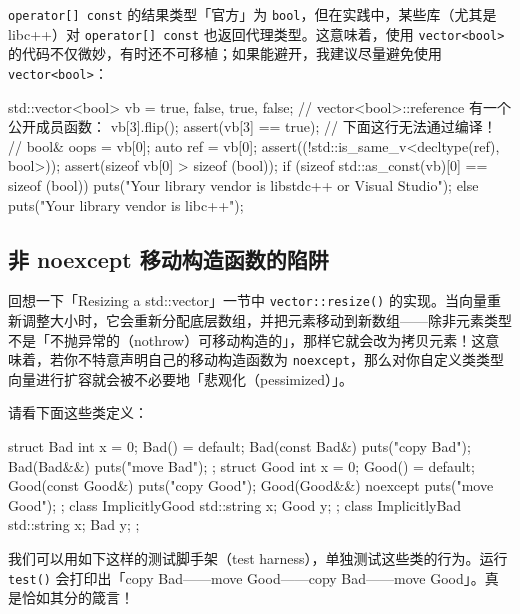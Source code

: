 \texttt{operator[] const} 的结果类型「官方」为 \texttt{bool}，但在实践中，某些库（尤其是 libc++）对 \texttt{operator[] const} 也返回代理类型。这意味着，使用 \texttt{vector<\allowbreak{}bool>\allowbreak{}} 的代码不仅微妙，有时还不可移植；如果能避开，我建议尽量避免使用 \texttt{vector<\allowbreak{}bool>\allowbreak{}}：

\begin{codebox}[cpp]
    std::vector<bool> vb = {true, false, true, false};
    // vector<bool>::reference 有一个公开成员函数：
    vb[3].flip();
    assert(vb[3] == true);
    // 下面这行无法通过编译！
    // bool& oops = vb[0];
    auto ref = vb[0];
    assert((!std::is_same_v<decltype(ref), bool>));
    assert(sizeof vb[0] > sizeof (bool));
    if (sizeof std::as_const(vb)[0] == sizeof (bool)) {
      puts("Your library vendor is libstdc++ or Visual Studio");
    } else {
      puts("Your library vendor is libc++");
    }
\end{codebox}

\subsection{非 noexcept 移动构造函数的陷阱}

回想一下「Resizing a std::vector」一节中 \texttt{vector::\allowbreak{}resize(\allowbreak{})\allowbreak{}} 的实现。当向量重新调整大小时，它会重新分配底层数组，并把元素移动到新数组——除非元素类型不是「不抛异常的（nothrow）可移动构造的」，那样它就会改为拷贝元素！这意味着，若你不特意声明自己的移动构造函数为 \texttt{noexcept}，那么对你自定义类类型向量进行扩容就会被不必要地「悲观化（pessimized）」。

请看下面这些类定义：

\begin{codebox}[cpp]
    struct Bad {
      int x = 0;
      Bad() = default;
      Bad(const Bad&) { puts("copy Bad"); }
      Bad(Bad&&) { puts("move Bad"); }
    };
    struct Good {
      int x = 0;
      Good() = default;
      Good(const Good&) { puts("copy Good"); }
      Good(Good&&) noexcept { puts("move Good"); }
    };
    class ImplicitlyGood {
      std::string x;
      Good y;
    };
    class ImplicitlyBad {
      std::string x;
      Bad y;
    };
\end{codebox}

我们可以用如下这样的测试脚手架（test harness），单独测试这些类的行为。运行 \texttt{test(\allowbreak{})\allowbreak{}} 会打印出「copy Bad——move Good——copy Bad——move Good」。真是恰如其分的箴言！

